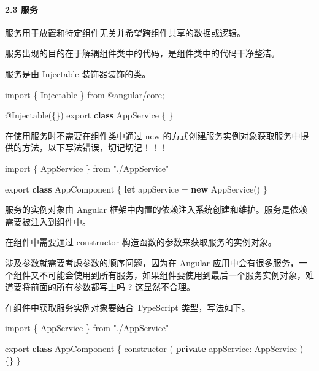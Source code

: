 \documentclass[
]{article}
\newenvironment{Shaded}{}{}
\newcommand{\DataTypeTok}[1]{\textcolor[rgb]{0.56,0.13,0.00}{#1}}
\newcommand{\FunctionTok}[1]{\textcolor[rgb]{0.02,0.16,0.49}{#1}}
\newcommand{\ImportTok}[1]{#1}
\newcommand{\KeywordTok}[1]{\textcolor[rgb]{0.00,0.44,0.13}{\textbf{#1}}}
\newcommand{\NormalTok}[1]{#1}
\newcommand{\OperatorTok}[1]{\textcolor[rgb]{0.40,0.40,0.40}{#1}}
\newcommand{\StringTok}[1]{\textcolor[rgb]{0.25,0.44,0.63}{#1}}
\begin{document}
\hypertarget{23-ux670dux52a1}{%
\paragraph{2.3 服务}\label{23-ux670dux52a1}}

服务用于放置和特定组件无关并希望跨组件共享的数据或逻辑。

服务出现的目的在于解耦组件类中的代码，是组件类中的代码干净整洁。

服务是由 Injectable 装饰器装饰的类。

\begin{Shaded}
\begin{Highlighting}[]
\ImportTok{import}\NormalTok{ \{ Injectable \} }\ImportTok{from} \StringTok{\textquotesingle{}@angular/core\textquotesingle{}}\OperatorTok{;}

\NormalTok{@}\FunctionTok{Injectable}\NormalTok{(\{\})}
\ImportTok{export} \KeywordTok{class}\NormalTok{ AppService \{ \}}
\end{Highlighting}
\end{Shaded}

在使用服务时不需要在组件类中通过 new
的方式创建服务实例对象获取服务中提供的方法，以下写法错误，切记切记！！！

\begin{Shaded}
\begin{Highlighting}[]
\ImportTok{import}\NormalTok{ \{ AppService \} }\ImportTok{from} \StringTok{"./AppService"}

\ImportTok{export} \KeywordTok{class}\NormalTok{ AppComponent \{}
  \KeywordTok{let}\NormalTok{ appService }\OperatorTok{=} \KeywordTok{new} \FunctionTok{AppService}\NormalTok{()}
\NormalTok{\}}
\end{Highlighting}
\end{Shaded}

服务的实例对象由 Angular
框架中内置的依赖注入系统创建和维护。服务是依赖需要被注入到组件中。

在组件中需要通过 constructor 构造函数的参数来获取服务的实例对象。

涉及参数就需要考虑参数的顺序问题，因为在 Angular
应用中会有很多服务，一个组件又不可能会使用到所有服务，如果组件要使用到最后一个服务实例对象，难道要将前面的所有参数都写上吗
? 这显然不合理。

在组件中获取服务实例对象要结合 TypeScript 类型，写法如下。

\begin{Shaded}
\begin{Highlighting}[]
\ImportTok{import}\NormalTok{ \{ AppService \} }\ImportTok{from} \StringTok{"./AppService"}

\ImportTok{export} \KeywordTok{class}\NormalTok{ AppComponent \{}
  \FunctionTok{constructor}\NormalTok{ (}
  	\KeywordTok{private} \DataTypeTok{appService}\OperatorTok{:}\NormalTok{ AppService}
\NormalTok{  ) \{\}}
\NormalTok{\}}
\end{Highlighting}
\end{Shaded}
\end{document}
